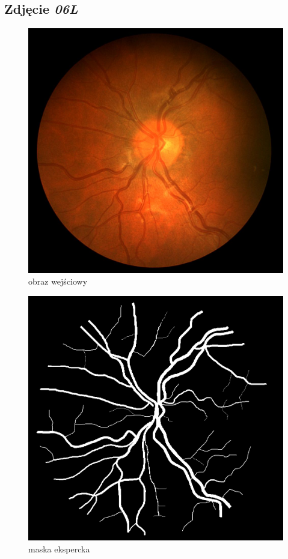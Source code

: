 \documentclass[polish,polish,a4paper]{article}
\begin{document}






		\subsection{Zdjęcie \textit{06L}}

\begin{figure}[!h]
	\centering
	\begin{minipage}{0.26\linewidth}
		\includegraphics[width=\linewidth]{../chase/Image_06L.jpg}
		\centering
			\small{obraz wejściowy}
	\end{minipage}
	\hfill
	\begin{minipage}{0.26\linewidth}
		\includegraphics[width=\linewidth]{../chase/Image_06L_1stHO.png}
		\centering
			\small{maska ekspercka}
	\end{minipage}
\end{figure}
\end{document}
